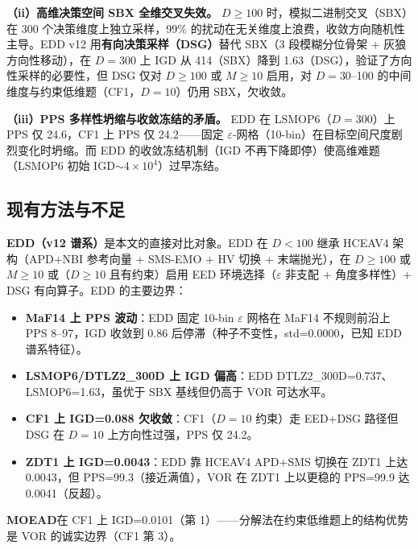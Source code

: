\documentclass[a4paper,11pt]{article}
\begin{document}
\textbf{（ii）高维决策空间 SBX 全维交叉失效。} $D\geq100$ 时，模拟二进制交叉（SBX）在 300 个决策维度上独立采样，99\% 的扰动在无关维度上浪费，收敛方向随机性主导。EDD v12 用\textbf{有向决策采样（DSG）}替代 SBX（3 段模糊分位骨架 + 灰狼方向性移动），在 $D=300$ 上 IGD 从 414（SBX）降到 1.63（DSG），验证了方向性采样的必要性，但 DSG 仅对 $D\geq100$ 或 $M\geq10$ 启用，对 $D=30$--100 的中间维度与约束低维题（CF1，$D=10$）仍用 SBX，欠收敛。

\textbf{（iii）PPS 多样性坍缩与收敛冻结的矛盾。} EDD 在 LSMOP6（$D=300$）上 PPS 仅 24.6，CF1 上 PPS 仅 24.2——固定 $\varepsilon$-网格（10-bin）在目标空间尺度剧烈变化时坍缩。而 EDD 的收敛冻结机制（IGD 不再下降即停）使高维难题（LSMOP6 初始 IGD$\sim4\times10^4$）过早冻结。

\subsection{现有方法与不足}
\textbf{EDD（v12 谱系）}是本文的直接对比对象。EDD 在 $D<100$ 继承 HCEAV4 架构（APD+NBI 参考向量 + SMS-EMO + HV 切换 + 末端抛光），在 $D\geq100$ 或 $M\geq10$ 或（$D\geq10$ 且有约束）启用 EED 环境选择（$\varepsilon$ 非支配 + 角度多样性）+ DSG 有向算子。EDD 的主要边界：
\begin{itemize}
\item \textbf{MaF14 上 PPS 波动}：EDD 固定 10-bin $\varepsilon$ 网格在 MaF14 不规则前沿上 PPS 8--97，IGD 收敛到 0.86 后停滞（种子不变性，std=0.0000，已知 EDD 谱系特征）。
\item \textbf{LSMOP6/DTLZ2\_300D 上 IGD 偏高}：EDD DTLZ2\_300D=0.737、LSMOP6=1.63，虽优于 SBX 基线但仍高于 VOR 可达水平。
\item \textbf{CF1 上 IGD=0.088 欠收敛}：CF1（$D=10$ 约束）走 EED+DSG 路径但 DSG 在 $D=10$ 上方向性过强，PPS 仅 24.2。
\item \textbf{ZDT1 上 IGD=0.0043}：EDD 靠 HCEAV4 APD+SMS 切换在 ZDT1 上达 0.0043，但 PPS=99.3（接近满值），VOR 在 ZDT1 上以更稳的 PPS=99.9 达 0.0041（反超）。
\end{itemize}

\textbf{MOEAD}在 CF1 上 IGD=0.0101（第 1）——分解法在约束低维题上的结构优势是 VOR 的诚实边界（CF1 第 3）。
\end{document}

